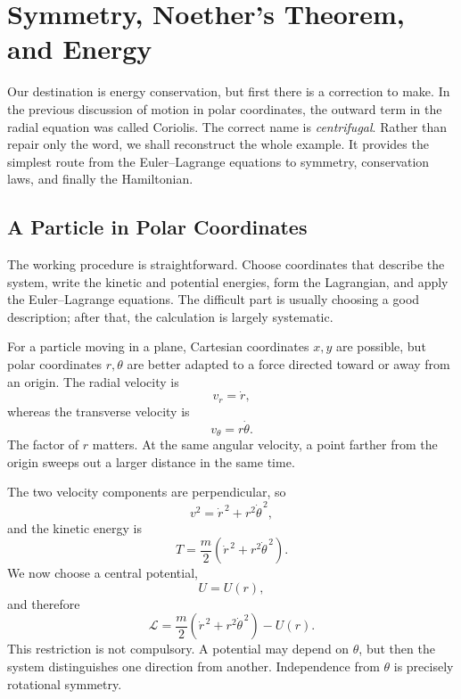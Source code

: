 \chapter{Symmetry, Noether's Theorem, and Energy}

Our destination is energy conservation, but first there is a correction to
make. In the previous discussion of motion in polar coordinates, the outward
term in the radial equation was called Coriolis. The correct name is
\emph{centrifugal}. Rather than repair only the word, we shall reconstruct the
whole example. It provides the simplest route from the Euler--Lagrange
equations to symmetry, conservation laws, and finally the Hamiltonian.

\section{A Particle in Polar Coordinates}

The working procedure is straightforward. Choose coordinates that describe
the system, write the kinetic and potential energies, form the Lagrangian, and
apply the Euler--Lagrange equations. The difficult part is usually choosing a
good description; after that, the calculation is largely systematic.

For a particle moving in a plane, Cartesian coordinates \(x,y\) are possible,
but polar coordinates \(r,\theta\) are better adapted to a force directed
toward or away from an origin. The radial velocity is
\begin{equation}
 v_r=\dot r,
\end{equation}
whereas the transverse velocity is
\begin{equation}
 v_\theta=r\dot\theta.
 \label{eq:l04-transverse-speed}
\end{equation}
The factor of \(r\) matters. At the same angular velocity, a point farther from
the origin sweeps out a larger distance in the same time.

The two velocity components are perpendicular, so
\begin{equation}
 v^2=\dot r^{\,2}+r^2\dot\theta^{\,2},
\end{equation}
and the kinetic energy is
\begin{equation}
 T=\frac{m}{2}\left(\dot r^{\,2}+r^2\dot\theta^{\,2}\right).
\end{equation}
We now choose a central potential,
\begin{equation}
 U=U(r),
\end{equation}
and therefore
\begin{equation}
 \mathcal L
 =\frac{m}{2}\left(\dot r^{\,2}+r^2\dot\theta^{\,2}\right)-U(r).
 \label{eq:l04-polar-lagrangian}
\end{equation}
This restriction is not compulsory. A potential may depend on \(\theta\), but
then the system distinguishes one direction from another. Independence from
\(\theta\) is precisely rotational symmetry.


